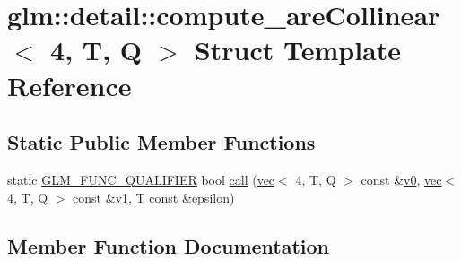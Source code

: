 \hypertarget{structglm_1_1detail_1_1compute__are_collinear_3_014_00_01_t_00_01_q_01_4}{}\section{glm\+:\+:detail\+:\+:compute\+\_\+are\+Collinear$<$ 4, T, Q $>$ Struct Template Reference}
\label{structglm_1_1detail_1_1compute__are_collinear_3_014_00_01_t_00_01_q_01_4}
\subsection*{Static Public Member Functions}
\begin{DoxyCompactItemize}
\item 
static \hyperlink{setup_8hpp_a33fdea6f91c5f834105f7415e2a64407}{G\+L\+M\+\_\+\+F\+U\+N\+C\+\_\+\+Q\+U\+A\+L\+I\+F\+I\+ER} bool \hyperlink{structglm_1_1detail_1_1compute__are_collinear_3_014_00_01_t_00_01_q_01_4_ad76314dc4d2ebd03e01707e521f91fb9}{call} (\hyperlink{structglm_1_1vec}{vec}$<$ 4, T, Q $>$ const \&\hyperlink{_s_d_l__opengl__glext_8h_a7062a23d1d434121d4a88f530703d06a}{v0}, \hyperlink{structglm_1_1vec}{vec}$<$ 4, T, Q $>$ const \&\hyperlink{_s_d_l__opengl__glext_8h_a435c176a02c061b43e19bdf7c86cceae}{v1}, T const \&\hyperlink{group__gtc__constants_ga2a1e57fc5592b69cfae84174cbfc9429}{epsilon})
\end{DoxyCompactItemize}


\subsection{Member Function Documentation}
\mbox{\label{structglm_1_1detail_1_1compute__are_collinear_3_014_00_01_t_00_01_q_01_4_ad76314dc4d2ebd03e01707e521f91fb9}} 
